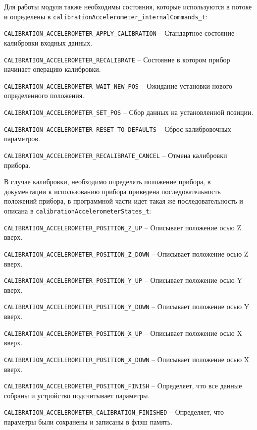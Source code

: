Для работы модуля также необходимы состояния, которые используются в потоке и определены в \lstinline{calibrationAccelerometer_internalCommands_t}:

\begin{enumerate_num}
    \item \lstinline{CALIBRATION_ACCELEROMETER_APPLY_CALIBRATION} -- Стандартное состояние калибровки входных данных.
    \item \lstinline{CALIBRATION_ACCELEROMETER_RECALIBRATE} -- Состояние в котором прибор начинает операцию калибровки.
    \item \lstinline{CALIBRATION_ACCELEROMETER_WAIT_NEW_POS} -- Ожидание установки нового определенного положения.
    \item \lstinline{CALIBRATION_ACCELEROMETER_SET_POS} -- Сбор данных на установленной позиции.
    \item \lstinline{CALIBRATION_ACCELEROMETER_RESET_TO_DEFAULTS} -- Сброс калибровочных параметров.
    \item \lstinline{CALIBRATION_ACCELEROMETER_RECALIBRATE_CANCEL} -- Отмена калибровки прибора.
\end{enumerate_num}

В случае калибровки, необходимо определять положение прибора, в документации к использованию прибора приведена последовательность положений прибора,
в программной части идет такая же последовательность и описана в \lstinline{calibrationAccelerometerStates_t}:

\begin{enumerate_num}
    \item \lstinline{CALIBRATION_ACCELEROMETER_POSITION_Z_UP} -- Описывает положение осью Z вверх.
    \item \lstinline{CALIBRATION_ACCELEROMETER_POSITION_Z_DOWN} -- Описывает положение осью Z вверх.
    \item \lstinline{CALIBRATION_ACCELEROMETER_POSITION_Y_UP} -- Описывает положение осью Y вверх.
    \item \lstinline{CALIBRATION_ACCELEROMETER_POSITION_Y_DOWN} -- Описывает положение осью Y вверх.
    \item \lstinline{CALIBRATION_ACCELEROMETER_POSITION_X_UP} -- Описывает положение осью X вверх.
    \item \lstinline{CALIBRATION_ACCELEROMETER_POSITION_X_DOWN} -- Описывает положение осью X вверх.
    \item \lstinline{CALIBRATION_ACCELEROMETER_POSITION_FINISH} -- Определяет, что все данные собраны и устройство подсчитывает параметры.
    \item \lstinline{CALIBRATION_ACCELEROMETER_CALIBRATION_FINISHED} -- Определяет, что параметры были сохранены и записаны в флэш память.
\end{enumerate_num}

